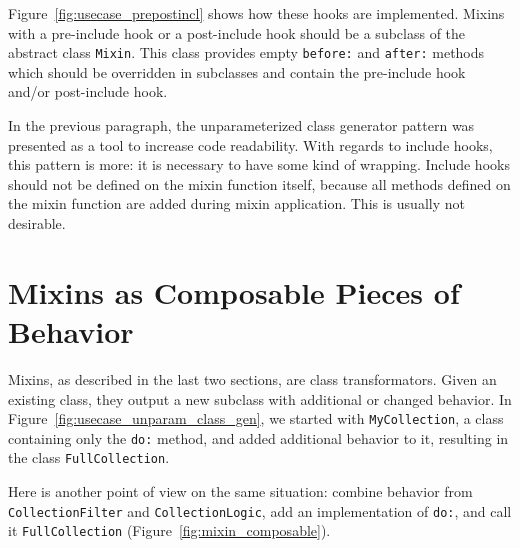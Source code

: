 Figure~\ref{fig:usecase_prepostincl} shows how these hooks are implemented. Mixins with a pre-include hook or a post-include hook should be a subclass of the abstract class \texttt{Mixin}. This class provides empty \texttt{before:} and \texttt{after:} methods which should be overridden in subclasses and contain the pre-include hook and/or post-include hook.

In the previous paragraph, the unparameterized class generator pattern was presented as a tool to increase code readability. With regards to include hooks, this pattern is more: it is necessary to have some kind of wrapping. Include hooks should not be defined on the mixin function itself, because all methods defined on the mixin function are added during mixin application. This is usually not desirable.

\section{Mixins as Composable Pieces of Behavior}
Mixins, as described in the last two sections, are class transformators. Given an existing class, they output a new subclass with additional or changed behavior. In Figure~\ref{fig:usecase_unparam_class_gen}, we started with \texttt{MyCollection}, a class containing only the \texttt{do:} method, and added additional behavior to it, resulting in the class \texttt{FullCollection}. 

Here is another point of view on the same situation: combine behavior from \texttt{CollectionFilter} and \texttt{CollectionLogic}, add an implementation of \texttt{do:}, and call it \texttt{FullCollection} (Figure~\ref{fig:mixin_composable}).

